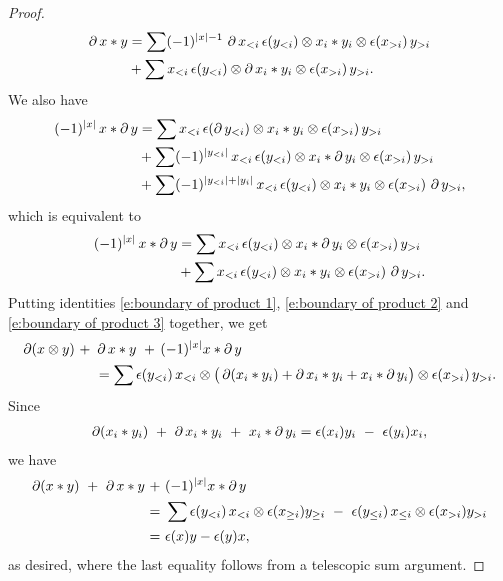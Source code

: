 \begin{proof}
\begin{equation}
\begin{split}
			\operatorname{\partial} x \ast y & =
			\sum (-1)^{|x|-1} \, \operatorname{\partial} x_{<i}\, \epsilon(y_{<i}) \otimes x_i \ast y_i \otimes \epsilon(x_{>i})\, y_{>i} \\ & +
			\sum x_{<i}\, \epsilon(y_{<i}) \otimes \operatorname{\partial} x_i \ast y_i \otimes \epsilon(x_{>i})\, y_{>i}.
		\end{split}
	\end{equation}
	We also have
	\begin{align*}
		(-1)^{|x|} \, x \ast \operatorname{\partial} y & =
		\sum x_{<i} \, \epsilon(\operatorname{\partial} y_{<i}) \otimes x_i \ast y_i \otimes \epsilon(x_{>i})\, y_{>i} \\ & +
		\sum (-1)^{|y_{<i}|} \, x_{<i}\, \epsilon(y_{<i}) \otimes x_i \ast \operatorname{\partial} y_i \otimes \epsilon(x_{>i}) \, y_{>i} \\ & +
		\sum (-1)^{|y_{<i}| + |y_i|} \, x_{<i}\, \epsilon(y_{<i}) \otimes x_i \ast y_i \otimes \epsilon(x_{>i}) \, \operatorname{\partial} y_{>i},
	\end{align*}
	which is equivalent to
	\begin{equation} \label{e:boundary of product 3}
		\begin{split}
			(-1)^{|x|} \, x \ast \operatorname{\partial} y & =
			\sum x_{<i} \, \epsilon(y_{<i}) \otimes x_i \ast \operatorname{\partial} y_i \otimes \epsilon(x_{>i})\, y_{>i} \\ & +
			\sum x_{<i}\, \epsilon(y_{<i}) \otimes x_i \ast y_i \otimes \epsilon(x_{>i})\, \operatorname{\partial} y_{>i}.
		\end{split}
	\end{equation}
	Putting identities \eqref{e:boundary of product 1}, \eqref{e:boundary of product 2} and \eqref{e:boundary of product 3} together, we get
	\begin{align*}
		\operatorname{\partial} (x \otimes y) \ +\ & \operatorname{\partial} x \ast y\ +\, (-1)^{|x|}x \ast \operatorname{\partial} y \\
		& = \sum \epsilon(y_{<i})\, x_{<i} \otimes \big(\operatorname{\partial}(x_i \ast y_i) + \operatorname{\partial} x_i \ast y_i + x_i \ast \operatorname{\partial} y_i\big) \otimes \epsilon(x_{>i})\, y_{>i}.
	\end{align*}
	Since
	\begin{align*}
		\operatorname{\partial}(x_i \ast y_i)\ +\ \operatorname{\partial} x_i \ast y_i\ +\ x_i \ast \operatorname{\partial} y_i =
		\epsilon(x_i)y_i\ -\ \epsilon(y_i)x_i,
	\end{align*}
	we have
	\begin{align*}
		\operatorname{\partial} (x \ast y) \ +\ \operatorname{\partial} x \ast y\ +\ & (-1)^{|x|}x \ast \operatorname{\partial} y \\ = \ &
		\sum \epsilon(y_{<i}) \, x_{<i} \otimes \epsilon(x_{\geq i}) y_{\geq i}\ -\
		\epsilon(y_{\leq i}) \, x_{\leq i} \otimes \epsilon(x_{>i}) y_{>i} \\ = \ &
		\epsilon(x)y - \epsilon(y)x,
	\end{align*}
	as desired, where the last equality follows from a telescopic sum argument.
\end{proof}

